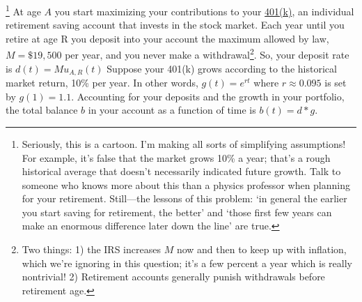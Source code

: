 \documentclass[answers]{exam}\newcommand{\repositoryInformationSetup}{     \usepackage[dvipsnames]{xcolor}     \usepackage[ angle=90, color=black, opacity=1, scale=2, ]{background}      \SetBgPosition{current page.west}      \SetBgVshift{-4.5mm}      \backgroundsetup{contents={{\color{green}\texttt{-{}-} differs from commit \texttt{40a9b87} in 0 files}}} } \newcommand{\commit}{{{\color{green}40a9b87}}}\usepackage{amsmath}
\begin{document}
\begin{questions}
\footnote{
Seriously, this is a cartoon.
I'm making all sorts of simplifying assumptions!
For example, it's false that the market grows 10\% a year; that's a rough historical average that doesn't necessarily indicated future growth.
Talk to someone who knows more about this than a physics professor when planning for your retirement.
Still---the lessons of this problem:
`in general the earlier you start saving for retirement, the better'
and
`those first few years can make an enormous difference later down the line' are true.
}
At age $A$ you start maximizing your contributions to your \href{https://en.wikipedia.org/wiki/401(k)}{401(k)}, an individual retirement saving account that invests in the stock market.
Each year until you retire at age R you deposit into your account the maximum allowed by law, $M=\$19,500$ per year, and you never make a withdrawal\footnote{
Two things:
1) the IRS increases $M$ now and then to keep up with inflation, which we're ignoring in this question; it's a few percent a year which is really nontrivial!
2) Retirement accounts generally punish withdrawals before retirement age.
}.
So, your deposit rate is $d(t) = M u_{A,R}(t)$
Suppose your 401(k) grows according to the historical market return, 10\% per year.
In other words, $g(t) = e^{rt}$ where $r\approx 0.095$ is set by $g(1) = 1.1$.
Accounting for your deposits and the growth in your portfolio, the total balance $b$ in your account as a function of time is $b(t) = d*g$.

\end{questions}
\end{document}
